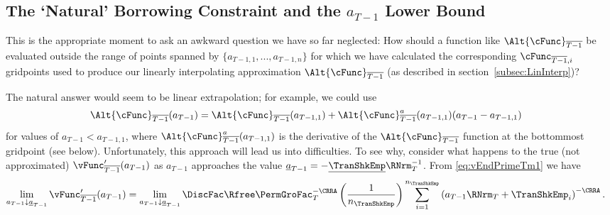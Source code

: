 \documentclass[titlepage, headings=optiontotocandhead]{\econtex}
\begin{document}
\hypertarget{The-Natural-Borrowing-Constraint-and-the-a-Lower-Bound}{}
\subsection{The `Natural' Borrowing Constraint and the $a_{T-1}$ Lower Bound} \label{subsec:LiqConstrSelfImposed}


This is the appropriate moment to ask an awkward question we have so far
neglected: How should a function like $\Alt{\cFunc}_{\overline{T-1}}$
be evaluated outside the range of points spanned by
$\{{a}_{T-1,1},...,{a}_{T-1,n}\}$ for which we have calculated
the corresponding $\cFunc_{\overline{T-1},i}$ gridpoints used to produce our
linearly interpolating approximation $\Alt{\cFunc}_{\overline{T-1}}$ (as described in section~\ref{subsec:LinInterp})?

The natural answer would seem to be linear extrapolation; for example, we could use
\begin{equation}\begin{gathered}\begin{aligned}
      \Alt{\cFunc}_{\overline{T-1}}({a}_{T-1})  & = \Alt{\cFunc}_{\overline{T-1}}({a}_{T-1,1})+\Alt{\cFunc}_{\overline{T-1}}^{{a}}({a}_{T-1,1})({a}_{T-1}-{a}_{T-1,1}) \label{eq:ExtrapLin}
    \end{aligned}\end{gathered}\end{equation}
for values of ${a}_{T-1} < {a}_{T-1,1}$, where $\Alt{\cFunc}_{\overline{T-1}}^{{a}}({a}_{T-1,1})$ is the derivative of the $\Alt{\cFunc}_{\overline{T-1}}$ function at the bottommost gridpoint (see below).  Unfortunately, this approach
will lead us into difficulties.  To see why, consider what
happens to the true (not approximated) $\vFunc^{\prime}_{\overline{T-1}}({a}_{T-1})$ as
${a}_{T-1}$ approaches the value
$\underline{a}_{T-1}=-\underline{\TranShkEmp}\RNrm_{T}^{-1}$.  From
\eqref{eq:vEndPrimeTm1} we have
\begin{equation}\begin{gathered}\begin{aligned}
      \lim_{{a}_{T-1} \downarrow \underline{a}_{T-1}} \vFunc^{\prime}_{\overline{T-1}}({a}_{T-1}) 
      & =                                                                                         \lim_{{a}_{T-1} \downarrow \underline{a}_{T-1}} \DiscFac \Rfree \PermGroFac_{T}^{-\CRRA} \left(\frac{1}{n_{\TranShkEmp}}\right) \sum_{i=1}^{n_{\TranShkEmp}} \left( {a}_{T-1} \RNrm_{T}+ \TranShkEmp_{i}\right)^{-\CRRA}.
    \end{aligned}\end{gathered}\end{equation}
\end{document}
